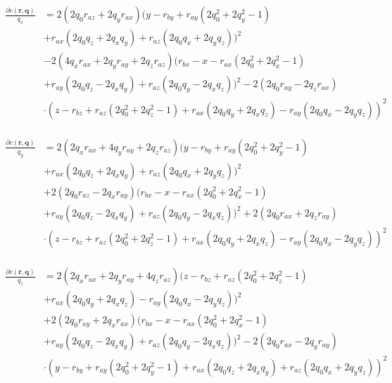 \begin{align}
\begin{split}
	\frac{\partial c(\bm{r}, \bm{q})}{q_x} &= 2(2q_0r_{az} + 2q_yr_{ax})(y - r_{by} + r_{ay}(2q_0^2 + 2q_y^2 - 1)\\
	&+ r_{ax}(2q_0q_z + 2q_xq_y) + r_{az}(2q_0q_x + 2q_yq_z))^2\\
	&- 2(4q_xr_{ax} + 2q_yr_{ay} + 2q_zr_{az})(r_{bx} - x - r_{ax}(2q_0^2 + 2q_x^2 - 1)\\
	&+ r_{ay}(2q_0q_z - 2q_xq_y) + r_{az}(2q_0q_y - 2q_xq_z))^2 - 2(2q_0r_{ay} - 2q_zr_{ax})\\
	&\cdot(z - r_{bz} + r_{az}(2q_0^2 + 2q_z^2 - 1) + r_{ax}(2q_0q_y + 2q_xq_z) - r_{ay}(2q_0q_x - 2q_yq_z))^2
\end{split}
\end{align}

\begin{align}
	\begin{split}
	\frac{\partial c(\bm{r}, \bm{q})}{q_y} &= 2(2q_xr_{ax} + 4q_yr_{ay} + 2q_zr_{az})(y - r_{by} + r_{ay}(2q_0^2 + 2q_y^2 - 1)\\
	&+ r_{ax}(2q_0q_z + 2q_xq_y) + r_{az}(2q_0q_x + 2q_yq_z))^2\\
	&+ 2(2q_0r_{az} - 2q_xr_{ay})(r_{bx} - x - r_{ax}(2q_0^2 + 2q_x^2 - 1) \\
	&+ r_{ay}(2q_0q_z - 2q_xq_y) + r_{az}(2q_0q_y - 2q_xq_z))^2 + 2(2q_0r_{ax} + 2q_zr_{ay})\\
	&\cdot(z - r_{bz} + r_{az}(2q_0^2 + 2q_z^2 - 1) + r_{ax}(2q_0q_y + 2q_xq_z) - r_{ay}(2q_0q_x - 2q_yq_z))^2
\end{split}
\end{align}

\begin{align}
	\begin{split}
	\frac{\partial c(\bm{r}, \bm{q})}{q_z} &= 2(2q_xr_{ax} + 2q_yr_{ay} + 4q_zr_{az})(z - r_{bz} + r_{az}(2q_0^2 + 2q_z^2 - 1)\\
	&+ r_{ax}(2q_0q_y + 2q_xq_z) - r_{ay}(2q_0q_x - 2q_yq_z))^2\\
	&+ 2(2q_0r_{ay} + 2q_xr_{ax})(r_{bx} - x - r_{ax}(2q_0^2 + 2q_x^2 - 1)\\
	&+ r_{ay}(2q_0q_z - 2q_xq_y) + r_{az}(2q_0q_y - 2q_xq_z))^2 - 2(2q_0r_{ax} - 2q_yr_{ay})\\
	&\cdot(y - r_{by} + r_{ay}(2q_0^2 + 2q_y^2 - 1) + r_{ax}(2q_0q_z + 2q_xq_y) + r_{az}(2q_0q_x + 2q_yq_z))^2
	\label{distance_constraint_der2}
\end{split}
\end{align}
\\

